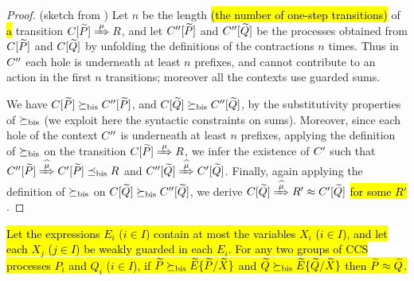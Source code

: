 \begin{proof}{(sketch from \cite{sangiorgi2017equations})}
  Let $n$ be the length \hl{(the number of one-step transitions)} of
\hl{a} transition $\ct{\til P}\Arr\mu R$, and
let $C'' [\widetilde P]$ and $C'' [\widetilde Q]$  be the processes obtained
from  $C [\widetilde P]$ and $C [\widetilde Q]$ by unfolding the definitions
of the contractions $n$ times. Thus in $C''$ each hole is
underneath at least $n$ prefixes, and cannot contribute to an action
in the first $n$ transitions; moreover all the contexts use guarded sums.

We have $C [\widetilde P] \mathrel{\succeq_{\rm{bis}}} C'' [\widetilde P]$, and 
$C [\widetilde Q] \mathrel{\succeq_{\rm{bis}}} C'' [\widetilde Q]$, 
 by the substitutivity  properties of $\mathrel{\succeq_{\rm{bis}}}$ (we exploit here
 the syntactic constraints on sums). Moreover,
 since each hole of the  context $C''$ is underneath at least $n$
 prefixes, applying the definition
 of $ \mathrel{\succeq_{\rm{bis}}}$ on the transition 
 $\ct{\til P}\Arr{\mu}  R$, we infer the existence
 of $C'$ such that 
$\ctpp{\til P}\Arcap{\mu} \ctp{\til P} \mexpaBIS R$
and 
$\ctpp{\til Q}\Arcap{\mu}  \ctp{\til Q}$.
Finally, again applying the definition of $\mathrel{\succeq_{\rm{bis}}}$ on 
$C [\widetilde Q] \mathrel{\succeq_{\rm{bis}}} C'' [\widetilde Q]$, 
we derive 
$\ct{\til Q}\Arcap{\mu} R' \wb \ctp{\til Q}$ \hl{for some $R'$}.
\end{proof}

\begin{theorem} %
\label{t:contraBisimulationU} %
\hl{Let the expressions $E_i$ ($i \in I$) contain at most the
  variables $X_i$ ($i \in I$), and let each $X_j$ ($j\in I$) be weakly
  guarded in each $E_i$. For any two groups of CCS processes $P_i$ and
  $Q_i$ ($i \in I$), if $\widetilde P \mathrel{\succeq_{\rm{bis}}} \widetilde E\{\widetilde P/\widetilde X\}$ and
    $\widetilde Q \mathrel{\succeq_{\rm{bis}}} \widetilde E\{\widetilde Q/\widetilde X\}$ then $\widetilde P \approx \widetilde Q$.}
\end{theorem}

